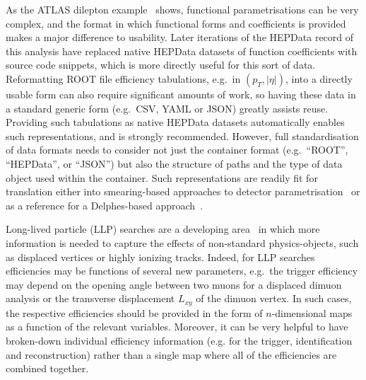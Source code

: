 \documentclass[a4paper,aps,prd,longbibliography,notitlepage,showpacs,amsmath,amssymb,superscriptaddress,nofootinbib,floatfix,11pt,preprintnumbers]{revtex4-1-mod}
\newcommand{\hepdata}{\textsf{HEPData}\xspace}
\renewcommand{\root}{\textsf{ROOT}\xspace}
\newcommand{\json}{\textsf{JSON}\xspace}
\newcommand{\yaml}{\textsf{YAML}\xspace}
\newcommand{\csv}{\textsf{CSV}\xspace}
\newcommand{\delphes}{\textsf{Delphes}\xspace}
\newcommand{\eg}{e.g.\xspace}
\begin{document}
As the ATLAS dilepton example~\cite{Aad:2019fac} shows, functional parametrisations can be very complex, and the format in which functional forms and coefficients is provided makes a major difference to usability. Later iterations of the \hepdata record of this analysis have replaced native \hepdata datasets of function coefficients with source code snippets, which is more directly useful for this sort of data.
Reformatting \root file efficiency tabulations, \eg~in $(p_T, |\eta|)$, into a directly usable form can also require significant amounts of work, so having these data in a standard generic form (\eg~\csv, \yaml or \json) greatly assists reuse. Providing such tabulations as native \hepdata datasets automatically enables such representations, and is strongly recommended. However, full standardisation of data formats needs to consider not just the container format (\eg~``\root'', ``\hepdata'', or ``\json'') but also the structure of paths and the type of data object used within the container.
Such representations are readily fit for translation either into smearing-based approaches to detector parametrisation~\cite{Buckley:2019stt,Araz:2020lnp} or as a reference for a \delphes-based approach~\cite{Dumont:2014tja,Conte:2018vmg}.

Long-lived particle (LLP) searches are a developing area~\cite{Alimena:2019zri} in which more information is needed to capture the effects of non-standard physics-objects, such as displaced vertices or highly ionizing tracks. Indeed, for LLP searches efficiencies may be functions of several new parameters, \eg~the trigger efficiency may depend on the opening angle between two muons for a displaced dimuon analysis or the transverse displacement $L_{xy}$ of the dimuon vertex. In such cases, the respective efficiencies should be provided in the form of $n$-dimensional maps as a function of the relevant variables. Moreover, it can be very helpful to have broken-down individual efficiency information (\eg for the trigger, identification and reconstruction) rather than a single map where all of the efficiencies are combined together.
\end{document}
